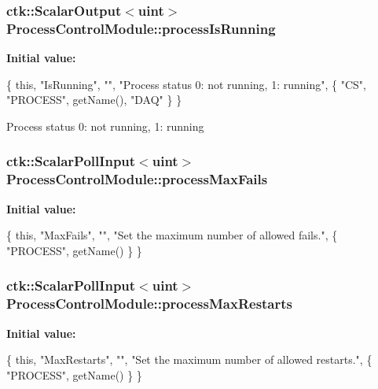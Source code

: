\subsubsection[{\texorpdfstring{process\+Is\+Running}{processIsRunning}}]{\setlength{\rightskip}{0pt plus 5cm}ctk\+::\+Scalar\+Output$<$uint$>$ Process\+Control\+Module\+::process\+Is\+Running}\hypertarget{structProcessControlModule_a63ba3083112290dc80113c7d0c29f6f9}{}\label{structProcessControlModule_a63ba3083112290dc80113c7d0c29f6f9}
{\bfseries Initial value\+:}
\begin{DoxyCode}
\{ \textcolor{keyword}{this}, \textcolor{stringliteral}{"IsRunning"}, \textcolor{stringliteral}{""}, \textcolor{stringliteral}{"Process status 0: not running, 1: running"},
      \{ \textcolor{stringliteral}{"CS"}, \textcolor{stringliteral}{"PROCESS"}, getName(), \textcolor{stringliteral}{"DAQ"} \} \}
\end{DoxyCode}
Process status 0\+: not running, 1\+: running 
\subsubsection[{\texorpdfstring{process\+Max\+Fails}{processMaxFails}}]{\setlength{\rightskip}{0pt plus 5cm}ctk\+::\+Scalar\+Poll\+Input$<$uint$>$ Process\+Control\+Module\+::process\+Max\+Fails}\hypertarget{structProcessControlModule_ad43eac1310031b1680275eaee2630378}{}\label{structProcessControlModule_ad43eac1310031b1680275eaee2630378}
{\bfseries Initial value\+:}
\begin{DoxyCode}
\{ \textcolor{keyword}{this}, \textcolor{stringliteral}{"MaxFails"}, \textcolor{stringliteral}{""},
    \textcolor{stringliteral}{"Set the maximum number of allowed fails."},
    \{ \textcolor{stringliteral}{"PROCESS"}, getName() \} \}
\end{DoxyCode}
\subsubsection[{\texorpdfstring{process\+Max\+Restarts}{processMaxRestarts}}]{\setlength{\rightskip}{0pt plus 5cm}ctk\+::\+Scalar\+Poll\+Input$<$uint$>$ Process\+Control\+Module\+::process\+Max\+Restarts}\hypertarget{structProcessControlModule_adc91d2e850a68ec74402d962e4305c4b}{}\label{structProcessControlModule_adc91d2e850a68ec74402d962e4305c4b}
{\bfseries Initial value\+:}
\begin{DoxyCode}
\{ \textcolor{keyword}{this}, \textcolor{stringliteral}{"MaxRestarts"}, \textcolor{stringliteral}{""},
    \textcolor{stringliteral}{"Set the maximum number of allowed restarts."},
    \{ \textcolor{stringliteral}{"PROCESS"}, getName() \} \}
\end{DoxyCode}
